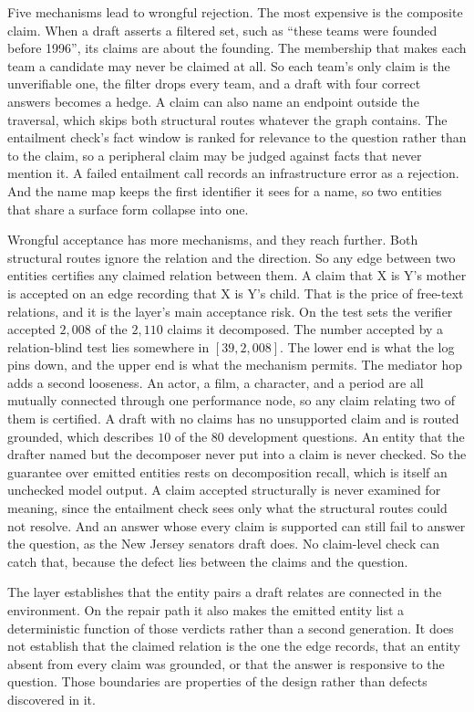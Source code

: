 Five mechanisms lead to wrongful rejection. The most expensive is the composite
claim. When a draft asserts a filtered set, such as ``these teams were founded
before 1996'', its claims are about the founding. The membership that makes each
team a candidate may never be claimed at all. So each team's only claim is the
unverifiable one, the filter drops every team, and a draft with four correct
answers becomes a hedge. A claim can also name an endpoint outside the
traversal, which skips both structural routes whatever the graph contains. The
entailment check's fact window is ranked for relevance to the question rather
than to the claim, so a peripheral claim may be judged against facts that never
mention it. A failed entailment call records an infrastructure error as a
rejection. And the name map keeps the first identifier it sees for a name, so
two entities that share a surface form collapse into one.

Wrongful acceptance has more mechanisms, and they reach further. Both structural
routes ignore the relation and the direction. So any edge between two entities
certifies any claimed relation between them. A claim that X is Y's mother is
accepted on an edge recording that X is Y's child. That is the price of
free-text relations, and it is the layer's main acceptance risk. On the test
sets the verifier accepted $2{,}008$ of the $2{,}110$ claims it decomposed. The
number accepted by a relation-blind test lies somewhere in $[39, 2{,}008]$. The
lower end is what the log pins down, and the upper end is what the mechanism
permits. The mediator hop adds a second looseness. An actor, a film, a
character, and a period are all mutually connected through one performance node,
so any claim relating two of them is certified. A draft with no claims has no
unsupported claim and is routed \textsf{grounded}, which describes $10$ of the
$80$ development questions. An entity that the drafter named but the decomposer
never put into a claim is never checked. So the guarantee over emitted entities
rests on decomposition recall, which is itself an unchecked model output. A
claim accepted structurally is never examined for meaning, since the entailment
check sees only what the structural routes could not resolve. And an answer
whose every claim is supported can still fail to answer the question, as the New
Jersey senators draft does. No claim-level check can catch that, because the
defect lies between the claims and the question.

The layer establishes that the entity pairs a draft relates are connected in the
environment. On the repair path it also makes the emitted entity list a
deterministic function of those verdicts rather than a second generation. It
does not establish that the claimed relation is the one the edge records, that
an entity absent from every claim was grounded, or that the answer is responsive
to the question. Those boundaries are properties of the design rather than
defects discovered in it.

\endinput
